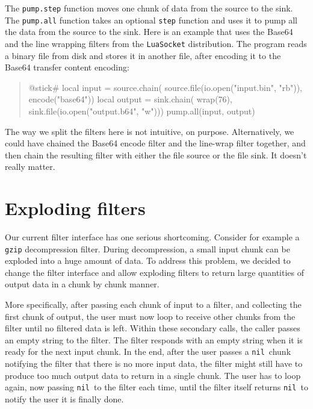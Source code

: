 \documentclass[10pt]{article}
\newcommand{\nil}{\texttt{nil}}
\begin{document}
			The \texttt{pump.step} function moves one chunk of data from
			the source to the sink. The \texttt{pump.all} function takes
			an optional \texttt{step} function and uses it to pump all the
			data from the source to the sink. 
			Here is an example that uses the Base64 and the
			line wrapping filters from the \texttt{LuaSocket}
			distribution.  The program reads a binary file from
			disk and stores it in another file, after encoding it to the
			Base64 transfer content encoding:
			\begin{quote}
			\begin{lua}
			@stick#
			local input = source.chain(
            source.file(io.open("input.bin", "rb")), 
            encode("base64"))
			local output = sink.chain(
            wrap(76),
            sink.file(io.open("output.b64", "w")))
			pump.all(input, output)
			\end{lua}
			\end{quote}
			
			The way we split the filters here is not intuitive, on
			purpose.  Alternatively, we could have chained the Base64
			encode filter and the line-wrap filter together, and then
			chain the resulting filter with either the file source or
			the file sink. It doesn't really matter. 
			
			\section{Exploding filters}
			
			Our current filter interface has one serious shortcoming.
			Consider for example a \texttt{gzip} decompression filter.
			During decompression, a small input chunk can be exploded
			into a huge amount of data. To address this problem, we
			decided to change the filter interface and allow exploding
			filters to return large quantities of output data in a chunk
			by chunk manner. 
			
			More specifically, after passing each chunk of input to
			a filter, and collecting the first chunk of output, the
			user must now loop to receive other chunks from the filter until no
			filtered data is left. Within these secondary calls, the
			caller passes an empty string to the filter. The filter
			responds with an empty string when it is ready for the next
			input chunk. In the end, after the user passes a
			\nil\ chunk notifying the filter that there is no
			more input data, the filter might still have to produce too
			much output data to return in a single chunk. The user has
			to loop again, now passing \nil\ to the filter each time,
			until the filter itself returns \nil\ to notify the
			user it is finally done.
			
\end{document}
